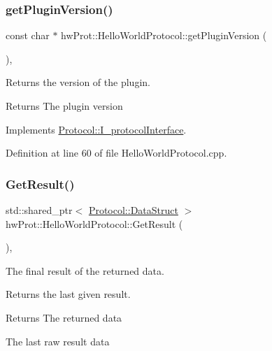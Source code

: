 \subsubsection{\texorpdfstring{getPluginVersion()}{getPluginVersion()}}
{\footnotesize\ttfamily const char $\ast$ hw\+Prot\+::\+Hello\+World\+Protocol\+::get\+Plugin\+Version (\begin{DoxyParamCaption}{ }\end{DoxyParamCaption})\hspace{0.3cm}{\ttfamily [override]}, {\ttfamily [virtual]}}



Returns the version of the plugin. 

\begin{DoxyReturn}{Returns}
The plugin version 
\end{DoxyReturn}


Implements \mbox{\hyperlink{classProtocol_1_1I__protocolInterface_abbdaeb43eba4c18b57e6f7010d9209bc}{Protocol\+::\+I\+\_\+protocol\+Interface}}.



Definition at line 60 of file Hello\+World\+Protocol.\+cpp.

\mbox{\label{classhwProt_1_1HelloWorldProtocol_a501dc84119c67434a430245efd4d7439}} 
\subsubsection{\texorpdfstring{GetResult()}{GetResult()}}
{\footnotesize\ttfamily std\+::shared\+\_\+ptr$<$ \mbox{\hyperlink{structProtocol_1_1DataStruct}{Protocol\+::\+Data\+Struct}} $>$ hw\+Prot\+::\+Hello\+World\+Protocol\+::\+Get\+Result (\begin{DoxyParamCaption}{ }\end{DoxyParamCaption})\hspace{0.3cm}{\ttfamily [override]}, {\ttfamily [virtual]}}



The final result of the returned data. 

Returns the last given result.

\begin{DoxyReturn}{Returns}
The returned data

The last raw result data 
\end{DoxyReturn}


